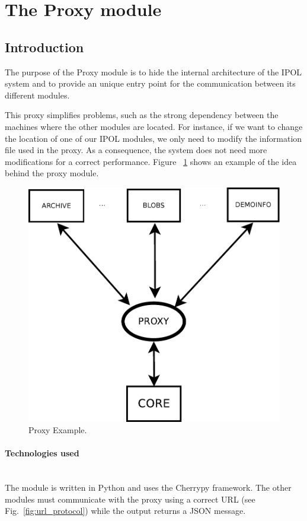 \section{The Proxy module}

\subsection{Introduction}
\label{sec:proxy_introduction}

The purpose of the Proxy module is to hide the internal architecture of the IPOL system and to provide an unique entry point for the communication between its different modules. 

This proxy simplifies problems, such as the strong dependency between the machines where the other modules are located. For instance, if we want to change the location of one of our IPOL modules, we only need to modify the information file used in the proxy. As a consequence, the system does not need more modifications for a correct performance. Figure ~\ref{fig:proxy_example} shows an example of the idea behind the proxy module.

\begin{figure}[!ht]
\centering
\includegraphics[width=0.5\columnwidth]{proxy/images/proxy_diagram.pdf}
\caption{Proxy Example.} 
\label{fig:proxy_example}
\end{figure}

\paragraph{Technologies used} \hspace{0pt} \\
The module is written in Python and uses the Cherrypy framework. The other modules must communicate with the proxy using a correct URL (see Fig.~\ref{fig:url_protocol}) while the output returns a JSON message.

